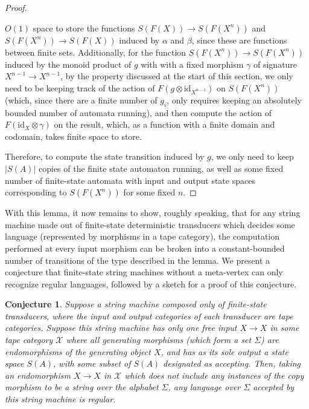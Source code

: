 \documentclass{article}
\newtheorem*{conjecture}{Conjecture}
\theoremstyle{definition}
\theoremstyle{remark}
\begin{document}
\begin{proof}
\begin{itemize}
$O(1)$ space to store the functions $S(F(X)) \to S(F(X^n))$ and
$S(F(X^n)) \to S(F(X))$ induced by $\alpha$ and $\beta$, since these
are functions between finite sets. Additionally, for the function
$S(F(X^n)) \to S(F(X^n))$ induced by the monoid product of $g$
with with a fixed morphism
$\gamma$ of signature $X^{n-1} \to X^{n-1}$, by
the property discussed at the start of this section, we only need to
be keeping track of the action of $F(g \otimes \mathrm{id}_{X^{n-1}})$
on $S(F(X^n))$ (which, since there are a finite number of
$g_i$, only requires keeping an absolutely bounded number of automata
running), and then compute the action of
$F(\mathrm{id}_X\otimes \gamma)$ on the result, which, as a function
with a finite domain and codomain, takes finite space to store.
\end{itemize}
Therefore, to compute the state transition induced by $g$, we only
need to keep $|S(A)|$ copies of the finite state automaton running,
as well as some fixed number of
finite-state automata with input and output
state spaces corresponding to
$S(F(X^n))$ for some fixed $n$.
\end{proof}
With this lemma, it now remains to show, roughly speaking, that
for any string machine made out of
finite-state
deterministic transducers which decides some language (represented by
morphisms in a tape category), the computation performed at every
input morphism can be broken into a constant-bounded number of transitions
of the type described in the lemma. We present a conjecture that
finite-state string machines without a meta-vertex can only recognize
regular languages, followed by a sketch for a proof of this conjecture.
\begin{conjecture}
    \label{prop:constantspacefortapecategories}
    Suppose a string machine composed only of finite-state transducers,
    where the input and output categories of each transducer are
    tape categories. Suppose this string
    machine has only one free input $X\to X$ in
    some tape category $\mathcal{X}$ where all generating
    morphisms (which form a set
    $\Sigma$) are endomorphisms of
    the generating object $X$, and has as its
    sole output a state space $S(A)$, with some subset of $S(A)$
    designated as accepting. Then, taking an endomorphism
    $X\to X$ in
    $\mathcal{X}$ which does not include any instances
    of the copy morphism to be a string over the alphabet $\Sigma$,
    any language over $\Sigma$
    accepted by this string machine is regular.
\end{conjecture}
\end{document}

